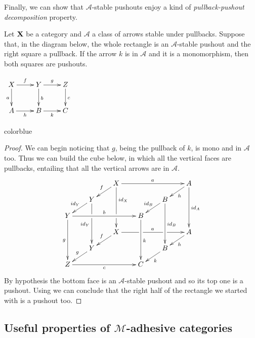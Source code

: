 \documentclass[a4paper,UKenglish,cleveref,pdftex,thm-restate,numberwithinsect,anonymous]{lipics}
\newcommand{\full}[1]{{color{blue}#1}}
\newcommand{\full}[1]{}
\newcommand{\id}[1]{\mathsf{id}_{#1}}
\def\X{\textbf {\textup{X}}}
\def\Y{\textbf {\textup{Y}}}
\begin{document}
Finally, we can show that $\mathcal{A}$-stable pushouts enjoy a kind of \emph{pullback-pushout decomposition} property.

\noindent 
\parbox{10cm}{
\begin{proposition}\label{prop:stab}Let $\X$ be a category and $\mathcal{A}$ a class of arrows stable under pullbacks. Suppose that, in the diagram below, the whole rectangle is an $\mathcal{A}$-stable pushout and the right square a pullback. If the arrow $k$ is in $\mathcal{A}$ and it is a monomorphism,  then both squares are pushouts.
\end{proposition}}
\parbox{4cm}{\vspace{-.3cm}
	$\xymatrix{X \ar[d]_{a} \ar[r]^{f}& \ar[r]^{g} Y \ar[d]^{b}& Z \ar[d]^{c}\\ A \ar[r]_{h}& B \ar[r]_{k}& C}$}

\full{ 
\begin{proof}
	We can begin noticing that $g$, being the pullback of $k$, is mono and in $\mathcal{A}$ too. Thus we can build the cube below, in which all the vertical faces are pullbacks, entailing that all the vertical arrows are in $\mathcal{A}$.
	\[\xymatrix@C=20pt@R=10pt{ & &X\ar[dl]_{f} \ar[ddd]^(.333333){\id{X}}|(.666666)\hole\ar[rrr]^{a} &&&A \ar[ddd]^{\id{A}} \ar[dl]^{h}\\& Y\ar[dl]_{\id{Y}} \ar[ddd]|(.333333)\hole_{\id{Y}} &&&B \ar[ddd]^{\id{B}} \ar[dl]_{\id{B}} \\Y \ar[ddd]_{g} \ar[rrr]^{b}&&& B\ar[ddd]^{k}\\&&X \ar[rrr]|(.34)\hole^{a}|(.67)\hole \ar[dl]_{f}&&& A \ar[dl]^{h}\\ & Y  \ar[dl]_{g}&&& B \ar[dl]^{k}\\ Z\ar[rrr]_{c} &&& C}\]
	By hypothesis the bottom face is an $\mathcal{A}$-stable pushout and so its top one is a pushout. Using \Cref{lem:po1} we can conclude that the right half of the rectangle we  started with is a pushout too.
\end{proof}}

\subsection{Useful properties of $\mathcal{M}$-adhesive categories}
\end{document}
